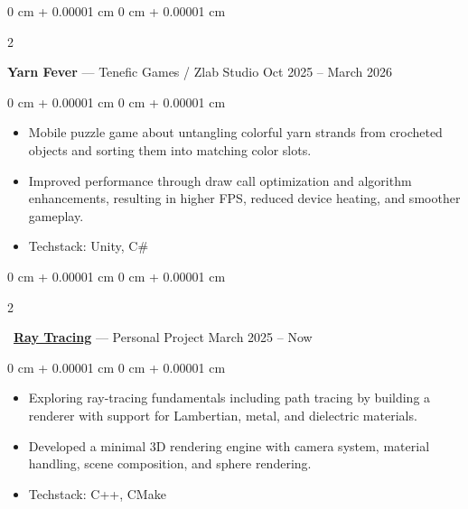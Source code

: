 \documentclass[10pt, letterpaper]{article}
\newenvironment{highlights}{
    \begin{itemize}[
        topsep=0.10 cm,
        parsep=0.10 cm,
        partopsep=0pt,
        itemsep=0pt,
        leftmargin=0 cm + 10pt
    ]
}{
    \end{itemize}
} %
\newenvironment{onecolentry}{
    \begin{adjustwidth}{
        0 cm + 0.00001 cm
    }{
        0 cm + 0.00001 cm
    }
}{
    \end{adjustwidth}
} %
\newenvironment{twocolentry}[2][]{
    \onecolentry
    \def\secondColumn{#2}
    \setcolumnwidth{\fill, 4.5 cm}
    \begin{paracol}{2}
}{
    \switchcolumn \raggedleft \secondColumn
    \end{paracol}
    \endonecolentry
} %
\begin{document}
        \vspace{0.2 cm}

        \begin{twocolentry}{
            Oct 2025 -- March 2026
        }
            \textbf{Yarn Fever} — Tenefic Games / Zlab Studio\end{twocolentry}
        \vspace{0.10 cm}
        \begin{onecolentry}
            \begin{highlights}
                \item Mobile puzzle game about untangling colorful yarn strands from crocheted objects and sorting them into matching color slots.
                \item Improved performance through draw call optimization and algorithm enhancements, resulting in higher FPS, reduced device heating, and smoother gameplay.
                \item Techstack: Unity, C\#
            \end{highlights}
        \end{onecolentry}

        \vspace{0.2 cm}

        \begin{twocolentry}{
            March 2025 -- Now
        }
            \faLink\ \href{https://github.com/duybuihoang/RayTracing}{\textbf{Ray Tracing}} — Personal Project\end{twocolentry}
        \vspace{0.10 cm}
        \begin{onecolentry}
            \begin{highlights}
                \item Exploring ray-tracing fundamentals including path tracing by building a renderer with support for Lambertian, metal, and dielectric materials.
                \item Developed a minimal 3D rendering engine with camera system, material handling, scene composition, and sphere rendering.
                \item Techstack: C++, CMake
            \end{highlights}
        \end{onecolentry}

        \vspace{0.2 cm}
\end{document}
